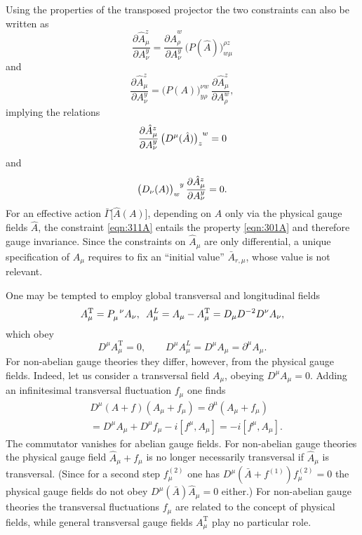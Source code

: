 \documentclass[twocolumn,aps,prd,amsmath,amssymb,preprintnumbers,longbibliography]{revtex4-1}
\numberwithin{equation}{section}
\newcommand{\transp}{\mathrm{T}}
\newenvironment{alignedeqn}{\begin{equation}\begin{aligned}}{\end{aligned}\end{equation}\ignorespacesafterend}
\begin{document}
Using the properties of the transposed projector the two constraints can also be written as
\begin{equation}\label{eqn:CC}
	\frac{\partial \hat{A}_\mu^z}{\partial A_\nu^y}
	= \frac{\partial \hat{A}_\rho^w}{\partial A_\nu^y} \, \bigl(P(\hat{A})\bigr)_{w \mu}^{\rho z}
\end{equation}
and
\begin{equation}\label{eqn:CD}
	\frac{\partial \hat{A}_\mu^z}{\partial A_\nu^y}
	= \bigl(P(A)\bigr)_{y \rho}^{\nu w} \, \frac{\partial \hat{A}_\mu^z}{\partial A_\rho^w},
\end{equation}
implying the relations
\begin{equation}\label{eqn:CE}
	\frac{\partial \hat{A}_\mu^z}{\partial A_\nu^y} \, \tensor{\bigl(D^\mu(\hat{A})\bigr)}{_z^w}
	= 0
\end{equation}
and
\begin{equation}\label{eqn:311A}
	\tensor{\bigl(D_\nu(A)\bigr)}{_w^y} \, \frac{\partial\hat{A}_\mu^z}{\partial A_\nu^y}
	= 0.
\end{equation}
For an effective action $\bar{\Gamma}\bigl[\hat{A}(A)\bigr]$, depending on $A$ only via the physical gauge fields $\hat{A}$, the constraint \eqref{eqn:311A} entails the property \eqref{eqn:301A} and therefore gauge invariance. Since the constraints on $\hat{A}_\mu$ are only differential, a unique specification of $\hat{A}_\mu$ requires to fix an ``initial value'' $\bar{A}_{r,\mu}$, whose value is not relevant.

One may be tempted to employ global transversal and longitudinal fields
\begin{equation}\label{eqn:G11D}
	A^\transp_\mu
	= \tensor{P}{_\mu^\nu} A_\nu,
	\enskip
	A^L_\mu
	= A_\mu - A^\transp_\mu
	= D_\mu D^{-2} D^\nu A_\nu,
\end{equation}
which obey
\begin{equation}\label{eqn:G11E}
	D^\mu A^\transp_\mu
	= 0,
	\qquad
	D^\mu A^L_\mu
	= D^\mu A_\mu
	= \partial^\mu A_\mu.
\end{equation}
For non-abelian gauge theories they differ, however, from the physical gauge fields. Indeed, let us consider a transversal field $A_\mu$, obeying $D^\mu A_\mu = 0$. Adding an infinitesimal transversal fluctuation $f_\mu$ one finds
\begin{alignedeqn}\label{eqn:G11F}
	&D^\mu(A + f)(A_\mu + f_\mu)
	= \partial^\mu(A_\mu + f_\mu)\\
	&= D^\mu A_\mu + D^\mu f_\mu - i [f^\mu,A_\mu]
	= -i [f^\mu,A_\mu].
\end{alignedeqn}
The commutator vanishes for abelian gauge fields. For non-abelian gauge theories the physical gauge field $\hat{A}_\mu+ f_\mu$ is no longer necessarily transversal if $\hat{A}_\mu$ is transversal. (Since for a second step $f^{(2)}_\mu$ one has $D^\mu(\bar{A} + f^{(1)})f^{(2)}_\mu = 0$ the physical gauge fields do not obey $D^\mu(\bar{A})\hat{A}_\mu = 0$ either.) For non-abelian gauge theories the transversal fluctuations $f_\mu$ are related to the concept of physical fields, while general transversal gauge fields $A^\transp_\mu$ play no particular role.
\end{document}
